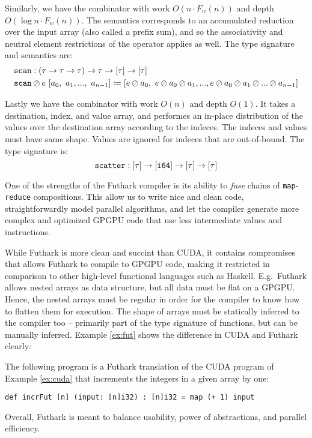 Similarly, we have the combinator  with work $O(n\cdot F_w(n))$ and depth
$O(\log n \cdot F_w(n))$. The semantics corresponds to an accumulated reduction over
the input array (also called a prefix sum), and so the associativity and neutral
element restrictions of the operator applies as well. The type signature and
semantics are:
\begin{align}
  &\mathtt{scan}:(\tau \to \tau \to \tau) \to \tau \to \mathtt{[}\tau\mathtt{]} \to \mathtt{[}\tau\mathtt{]}\\
  & \mathtt{scan} \oslash e~[a_0,~a_1,...,~a_{n-1}] \coloneq [e \oslash a_0,~e \oslash a_0 \oslash a_1,..., e \oslash a_0 \oslash a_1 \oslash ...\oslash a_{n-1}]
\end{align}

Lastly we have the combinator  with work $O(n)$ and depth $O(1)$.
It takes a destination, index, and value array, and performes an in-place
distribution of the values over the destination array according to the
indeces. The indeces and values must have same shape. Values are ignored for
indeces that are out-of-bound. The type signature is:
\begin{equation}
\mathtt{scatter}:\mathtt{[}\tau\mathtt{]} \to \mathtt{[}\mathtt{i64}\mathtt{]} \to \mathtt{[}\tau\mathtt{]} \to \mathtt{[}\tau\mathtt{]}
\end{equation}

One of the strengths of the Futhark compiler is its ability to \textit{fuse}
chains of \texttt{map}-\texttt{reduce} compositions. This allow us to write nice
and clean code, straightforwardly model parallel algorithms, and let the
compiler generate more complex and optimized GPGPU code that use less
intermediate values and instructions.

While Futhark is more clean and succint than CUDA, it contains compromises that
allows Futhark to compile to GPGPU code, making it restricted in comparison to
other high-level functional languages such as Haskell. E.g.\ Futhark allows
nested arrays as data structure, but all data must be flat on a GPGPU. Hence,
the nested arrays must be regular in order for the compiler to know how to
flatten them for execution. The shape of arrays must be statically inferred to
the compiler too -- primarily part of the type signature of functions, but can be
manually inferred. Example \ref{ex:fut} shows the difference in CUDA and Futhark
clearly:

\begin{example}\label{ex:fut}
  The following program is a Futhark translation of the CUDA program of Example
  \ref{ex:cuda} that increments the integers in a given array by one:
\begin{lstlisting}[language=futhark]
def incrFut [n] (input: [n]i32) : [n]i32 = map (+ 1) input
\end{lstlisting}
\end{example}

Overall, Futhark is meant to balance usability, power of abstractions, and
parallel efficiency.

